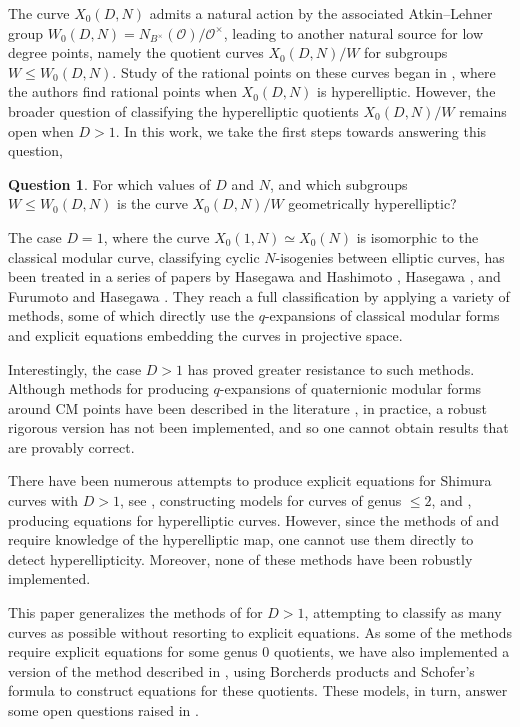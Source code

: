 \documentclass[12pt]{amsart}
\newcommand{\calO}{\mathcal{O}}
\numberwithin{equation}{subsection}
\theoremstyle{plain}\newtheorem{ithm}{Theorem}
\theoremstyle{plain}\newtheorem{iprop}[ithm]{Proposition}
\theoremstyle{definition}
\newtheorem{question}[]{Question}
\theoremstyle{remark}
\newcommand{\Order}{\calO} %
\newcommand{\Curve}[2]{X_0({#1},{#2})} %
\newcommand{\ALfull}[2]{W_0({#1},{#2})} %
\begin{document}
The curve $\Curve{D}{N}$ admits a natural action by the associated Atkin--Lehner group $\ALfull{D}{N} = N_{B^{\times}}(\Order) / \Order^{\times}$, leading to another natural source for low degree points, namely the quotient curves $\Curve{D}{N}/W$ for subgroups $W \le \ALfull{D}{N}$. 
Study of the rational points on these curves began in \cite{OanaCiaran}, where the authors find rational points when $\Curve{D}{N}$ is hyperelliptic. However, the broader question of classifying the hyperelliptic quotients $\Curve{D}{N}/W$  remains open when $D > 1$. In this work, we take the first steps towards answering this question,
\begin{question}
    For which values of $D$ and $N$, and which subgroups $W \le \ALfull{D}{N}$ is the curve $\Curve{D}{N}/W$ geometrically hyperelliptic?
\end{question}
The case $D = 1$, where the curve $\Curve{1}{N} \simeq X_0(N)$ is isomorphic to the classical modular curve, classifying cyclic $N$-isogenies between elliptic curves, has been treated in a series of papers by Hasegawa and Hashimoto \cite{HH96}, Hasegawa \cite{HasegawaStarcurves}, and Furumoto and Hasegawa \cite{FH99}. They reach a full classification by applying a variety of methods, some of which directly use the $q$-expansions of classical modular forms and explicit equations embedding the curves in projective space. 

Interestingly, the case $D > 1$ has proved greater resistance to such methods. Although methods for producing $q$-expansions of quaternionic modular forms around CM points have been described in the literature \cite{VW14, Nelson}, in practice, a robust rigorous version has not been implemented, and so one cannot obtain results that are provably correct.

There have been numerous attempts to produce explicit equations for Shimura curves with $D > 1$, see \cite{Takeuchi, Elkies, GRgenus2, GRgenus1, Yang, OanaFreddy},
constructing models for curves of genus $\le 2$, and \cite{Molina, GY17}, producing equations for hyperelliptic curves. 
However, since the methods of \cite{Molina} and \cite{GY17} require knowledge of the hyperelliptic map, one cannot use them directly to detect hyperellipticity. Moreover, none of these methods have been robustly implemented.

This paper generalizes the methods of \cite{HH96,HasegawaStarcurves,FH99} for $D > 1$, attempting to classify as many curves as possible without resorting to explicit equations. As some of the methods require explicit equations for some genus $0$ quotients, we have also implemented a version of the method described in \cite{GY17}, using Borcherds products and Schofer's formula to construct equations for these quotients. These models, in turn, answer some open questions raised in \cite{OanaFreddy}.
\end{document}
